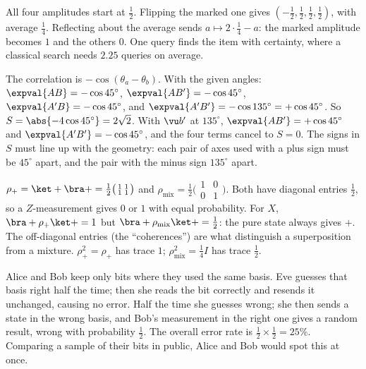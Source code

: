  All four amplitudes start at $\tfrac12$. Flipping the marked one gives $(-\tfrac12,\tfrac12,\tfrac12,\tfrac12)$, with average $\tfrac14$. Reflecting about the average sends $a\mapsto2\cdot\tfrac14 - a$: the marked amplitude becomes $1$ and the others $0$. One query finds the item with certainty, where a classical search needs $2.25$ queries on average.

 The correlation is $-\cos(\theta_a-\theta_b)$. With the given angles: $\expval{AB} = -\cos45^\circ$, $\expval{AB'} = -\cos45^\circ$, $\expval{A'B} = -\cos45^\circ$, and $\expval{A'B'} = -\cos135^\circ = +\cos45^\circ$. So $S = \abs{-4\cos45^\circ} = 2\sqrt2$. With $\vu b'$ at $135^\circ$, $\expval{AB'} = +\cos45^\circ$ and $\expval{A'B'} = -\cos45^\circ$, and the four terms cancel to $S = 0$. The signs in $S$ must line up with the geometry: each pair of axes used with a plus sign must be $45^\circ$ apart, and the pair with the minus sign $135^\circ$ apart.

 $\rho_+ = \ket+\bra+ = \tfrac12\bigl(\begin{smallmatrix}1&1\\1&1\end{smallmatrix}\bigr)$ and $\rho_{\text{mix}} = \tfrac12\bigl(\begin{smallmatrix}1&0\\0&1\end{smallmatrix}\bigr)$. Both have diagonal entries $\tfrac12$, so a $Z$-measurement gives $0$ or $1$ with equal probability. For $X$, $\bra+\rho_+\ket+ = 1$ but $\bra+\rho_{\text{mix}}\ket+ = \tfrac12$: the pure state always gives $+$. The off-diagonal entries (the ``coherences'') are what distinguish a superposition from a mixture. $\rho_+^2 = \rho_+$ has trace $1$; $\rho_{\text{mix}}^2 = \tfrac14I$ has trace $\tfrac12$.

 Alice and Bob keep only bits where they used the same basis. Eve guesses that basis right half the time; then she reads the bit correctly and resends it unchanged, causing no error. Half the time she guesses wrong; she then sends a state in the wrong basis, and Bob's measurement in the right one gives a random result, wrong with probability $\tfrac12$. The overall error rate is $\tfrac12\times\tfrac12 = 25\%$. Comparing a sample of their bits in public, Alice and Bob would spot this at once.

